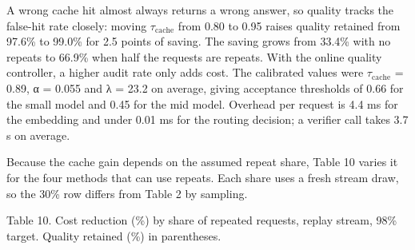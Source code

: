\documentclass[
  10pt,
]{article}
\begin{document}
A wrong cache hit almost always returns a wrong answer, so quality
tracks the false-hit rate closely: moving \(\tau_{\mathrm{cache}}\) from
0.80 to 0.95 raises quality retained from 97.6\% to 99.0\% for 2.5
points of saving. The saving grows from 33.4\% with no repeats to 66.9\%
when half the requests are repeats. With the online quality controller,
a higher audit rate only adds cost. The calibrated values were
\(\tau_{\mathrm{cache}}\) = 0.89, α = 0.055 and λ = 23.2 on average,
giving acceptance thresholds of 0.66 for the small model and 0.45 for
the mid model. Overhead per request is 4.4 ms for the embedding and
under 0.01 ms for the routing decision; a verifier call takes 3.7 s on
average.

Because the cache gain depends on the assumed repeat share, Table 10
varies it for the four methods that can use repeats. Each share uses a
fresh stream draw, so the 30\% row differs from Table 2 by sampling.

Table 10. Cost reduction (\%) by share of repeated requests, replay
stream, 98\% target. Quality retained (\%) in parentheses.
\end{document}
